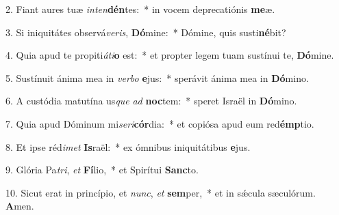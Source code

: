 2. Fiant aures tuæ \textit{in}\textit{ten}\textbf{dén}tes:~*  in vocem deprecatiónis \textbf{me}æ.\

3. Si iniquitátes observá\textit{ve}\textit{ris}, \textbf{Dó}mine:~*  Dómine, quis susti\textbf{né}bit?\

4. Quia apud te propiti\textit{á}\textit{ti}\textbf{o} est:~*  et propter legem tuam sustínui te, \textbf{Dó}mine.\

5. Sustínuit ánima mea in \textit{ver}\textit{bo} \textbf{e}jus:~*  sperávit ánima mea in \textbf{Dó}mino.\

6. A custódia matutína us\textit{que} \textit{ad} \textbf{noc}tem:~*  speret Israël in \textbf{Dó}mino.\

7. Quia apud Dóminum mi\textit{se}\textit{ri}\textbf{cór}dia:~*  et copiósa apud eum red\textbf{émp}tio.\

8. Et ipse réd\textit{i}\textit{met} \textbf{Is}raël:~*  ex ómnibus iniquitátibus \textbf{e}jus.\

9. Glória Pa\textit{tri}, \textit{et} \textbf{Fí}lio,~*  et Spirítui \textbf{Sanc}to.\

10. Sicut erat in princípio, et \textit{nunc}, \textit{et} \textbf{sem}per,~*  et in sǽcula sæculórum. \textbf{A}men.\

